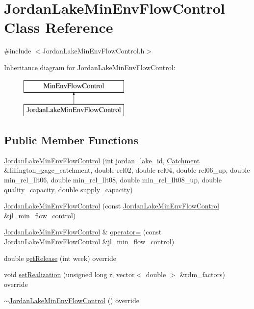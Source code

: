 \hypertarget{classJordanLakeMinEnvFlowControl}{}\section{Jordan\+Lake\+Min\+Env\+Flow\+Control Class Reference}
\label{classJordanLakeMinEnvFlowControl}


{\ttfamily \#include $<$Jordan\+Lake\+Min\+Env\+Flow\+Control.\+h$>$}

Inheritance diagram for Jordan\+Lake\+Min\+Env\+Flow\+Control\+:\begin{figure}[H]
\begin{center}
\leavevmode
\includegraphics[height=2.000000cm]{classJordanLakeMinEnvFlowControl}
\end{center}
\end{figure}
\subsection*{Public Member Functions}
\begin{DoxyCompactItemize}
\item 
\mbox{\hyperlink{classJordanLakeMinEnvFlowControl_ac8e2b846b66115c2db3bc4ea3ed44297}{Jordan\+Lake\+Min\+Env\+Flow\+Control}} (int jordan\+\_\+lake\+\_\+id, \mbox{\hyperlink{classCatchment}{Catchment}} \&lillington\+\_\+gage\+\_\+catchment, double rel02, double rel04, double rel06\+\_\+up, double min\+\_\+rel\+\_\+llt06, double min\+\_\+rel\+\_\+llt08, double min\+\_\+rel\+\_\+llt08\+\_\+up, double quality\+\_\+capacity, double supply\+\_\+capacity)
\item 
\mbox{\hyperlink{classJordanLakeMinEnvFlowControl_a44dfb259a9b61886b9acfcb3bec96c0f}{Jordan\+Lake\+Min\+Env\+Flow\+Control}} (const \mbox{\hyperlink{classJordanLakeMinEnvFlowControl}{Jordan\+Lake\+Min\+Env\+Flow\+Control}} \&jl\+\_\+min\+\_\+flow\+\_\+control)
\item 
\mbox{\hyperlink{classJordanLakeMinEnvFlowControl}{Jordan\+Lake\+Min\+Env\+Flow\+Control}} \& \mbox{\hyperlink{classJordanLakeMinEnvFlowControl_a939dc49f5e9a80a2f9a3c9c6bdce98fb}{operator=}} (const \mbox{\hyperlink{classJordanLakeMinEnvFlowControl}{Jordan\+Lake\+Min\+Env\+Flow\+Control}} \&jl\+\_\+min\+\_\+flow\+\_\+control)
\item 
double \mbox{\hyperlink{classJordanLakeMinEnvFlowControl_a5c2456c26fa141824c247cd15bf5c57d}{get\+Release}} (int week) override
\item 
void \mbox{\hyperlink{classJordanLakeMinEnvFlowControl_aa1e816121060212f3dbeffda90a7baec}{set\+Realization}} (unsigned long r, vector$<$ double $>$ \&rdm\+\_\+factors) override
\item 
\mbox{\hyperlink{classJordanLakeMinEnvFlowControl_a97c9cefc5e56d0bee8075a7c1616143e}{$\sim$\+Jordan\+Lake\+Min\+Env\+Flow\+Control}} () override
\end{DoxyCompactItemize}

